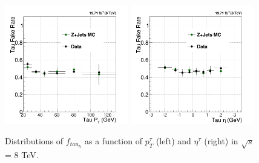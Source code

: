 \documentclass[oneside, letterpaper, oldfontcommands]{memoir}
\begin{document}
\begin{figure}[hbtp]\centering
\includegraphics[width=0.48\textwidth]{tightOldIso_looseOldIso_tPt_fakeRate_8TeV.png}
\includegraphics[width=0.48\textwidth]{tightOldIso_looseOldIso_tEta_fakeRate_8TeV.png}
\caption{Distributions of $f_{tau_{h}}$ as a function of $ p_{T}^{\tau}$ (left) and $\eta^{\tau}$ (right) in $\sqrt{s}$ = 8 TeV.}
\label{fig:taufakerate8TeV}\end{figure}
\end{document}
